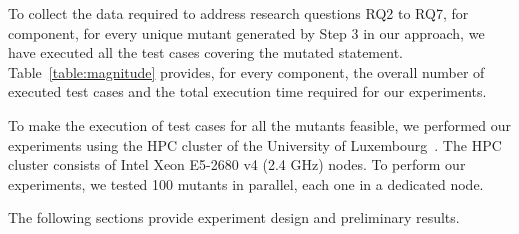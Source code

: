 %



 {To collect the data required to address research questions RQ2 to RQ7, for component, for every unique mutant generated by Step 3 in our approach, we have executed all the test cases covering the mutated statement. Table~\ref{table:magnitude} provides, for every component, the overall number of executed test cases and the total execution time required for our experiments. 
 } 

To make the execution of test cases for all the mutants feasible, we performed our experiments using the HPC cluster of the University of Luxembourg~\cite{HPC}.
The HPC cluster consists of Intel Xeon E5-2680 v4 (2.4 GHz) nodes. To perform our experiments, we tested 100 mutants in parallel, each one in a dedicated node.

The following sections provide experiment design and preliminary results. 



% 


